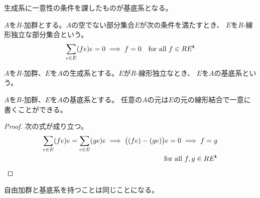 {	生成系に一意性の条件を課したものが基底系となる。

	\begin{definition}[加群での線形独立]\label{def:加群での線形独立} %
		$A$を$R$-加群とする。$A$の空でない部分集合$E$が次の条件を満たすとき、
		$E$を$R$-線形独立な部分集合という。
		\begin{equation*}\begin{split}
			\sum_{e\in E}(fe)e = 0 \implies f = 0
			\quad\text{for all } f\in RE^{\mathbf{t}}
		\end{split}\end{equation*}
	\end{definition} %

	\begin{definition}[加群の基底系]\label{def:加群の基底系} %
		$A$を$R$-加群、$E$を$A$の生成系とする。$E$が$R$-線形独立なとき、
		$E$を$A$の基底系という。
	\end{definition} %

	\begin{proposition}[基底系による一意的な表現]
	\label{prop:基底系による一意的な表現} %
		$A$を$R$-加群、$E$を$A$の基底系とする。
		任意の$A$の元は$E$の元の線形結合で一意に書くことができる。
	\end{proposition} %
	\begin{proof} 次の式が成り立つ。
		\begin{equation*}\begin{split}
			\sum_{e\in E}(fe)e = \sum_{e\in E}(ge)e
			\implies \bigl((fe) - (ge)\bigr)e = 0 \implies f = g \\
			\quad\text{for all } f,g\in RE^{\mathbf{t}}
		\end{split}\end{equation*}
	\end{proof}

	自由加群と基底系を持つことは同じことになる。

}
